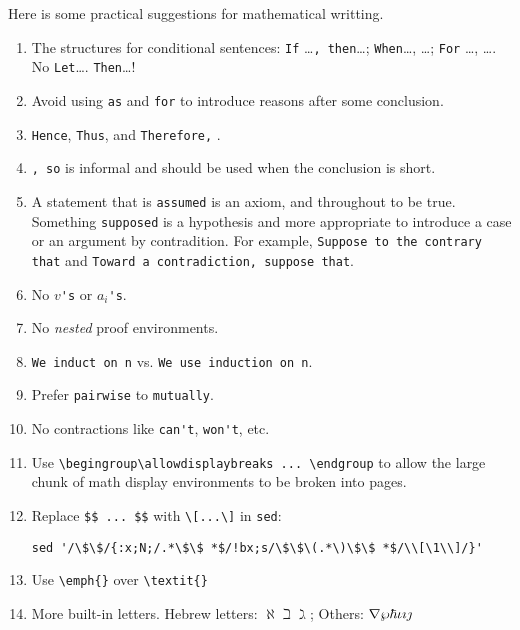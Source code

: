 \documentclass[a4paper,12pt]{amsart}
\theoremstyle{plain}
\theoremstyle{definition}
\theoremstyle{remark}
\numberwithin{equation}{section} %
\begin{document}
Here is some practical suggestions for mathematical writting.
\begin{enumerate}
	\item The structures for conditional sentences: \verb|If| \ldots\verb|, then|\ldots; \verb|When|\ldots, \ldots; \verb|For| \ldots, \ldots. No \verb|Let|\ldots. \verb|Then|\ldots!

	\item Avoid using \verb|as| and \verb|for| to introduce reasons after some conclusion.

	\item \verb|Hence|, \verb|Thus|, and \verb|Therefore,| .

	\item \verb|, so| is informal and should be used when the conclusion is short.

	\item A statement that is \verb|assumed| is an axiom, and throughout to be true. Something \verb|supposed| is a hypothesis and more appropriate to introduce a case or an argument by contradition. For example, \verb|Suppose to the contrary that| and \verb|Toward a contradiction, suppose that|.

	\item No $ v $\verb|'s| or $ a_{i} $\verb|'s|.

	\item No \textit{nested} proof environments.

	\item \verb|We induct on n| vs. \verb|We use induction on n|.

	\item Prefer \verb|pairwise| to \verb|mutually|.

	\item No contractions like \verb|can't|, \verb|won't|, etc.

	\item Use \verb|\begingroup\allowdisplaybreaks ... \endgroup| to allow the large chunk of math display environments to be broken into pages.

	\item Replace \verb|$$ ... $$| with \verb|\[...\]| in \verb|sed|:

	      \verb|sed '/\$\$/{:x;N;/.*\$\$ *$/!bx;s/\$\$\(.*\)\$\$ *$/\\[\1\\]/}'|

	\item Use \verb*|\emph{}| over \verb|\textit{}|

	\item More built-in letters. Hebrew letters: $ \aleph \beth \gimel $; Others: $ \nabla \wp \hbar \box \eth \iota \imath \jmath $

\end{enumerate}
\end{document}
